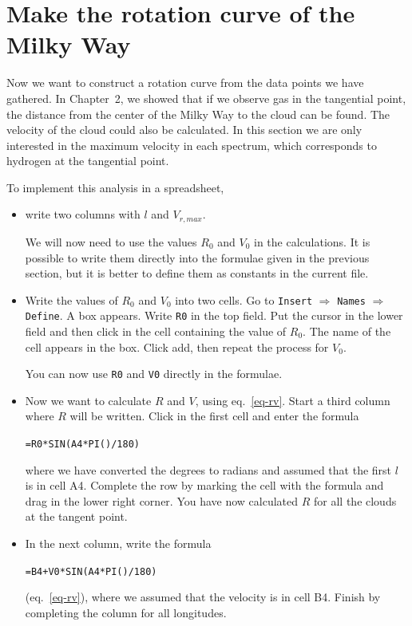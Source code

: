 \section{Make the rotation curve of the Milky Way}
Now we want to construct a rotation curve from the data points we have
gathered. In Chapter~2, we showed that if we observe gas in the tangential
point, the distance from the center of the Milky Way to the cloud can be found.
The velocity of the cloud could also be calculated. In this section we are only
interested in the maximum velocity in each spectrum, which corresponds to
hydrogen at the tangential point.

To implement this analysis in a spreadsheet, 
\begin{itemize}

\item write two columns with
$l$ and $V_{r,max}$. 
 
We will now need to use the values $R_0$ and
$V_0$ in the calculations. It is possible to write them directly into
the formulae given in the previous section, 
but it is better to define them as constants in the
current file. 

\item Write the values of $R_0$
and $V_0$ into two cells. Go to {\tt Insert} $\Rightarrow$ {\tt Names}
$\Rightarrow$ {\tt Define}. A box appears. Write {\tt R0} in the top
field. Put the cursor in the lower field and then click in the cell
containing the value of $R_0$. The name of the cell appears in the
box. Click add, then repeat the process for $V_0$.

You can now use {\tt R0} and {\tt V0} directly in the formulae. 

\item Now we want to calculate $R$ and $V$, using eq.~\ref{eq-rv}. 
Start a third column where $R$ will be written. 
Click in the first cell and enter the formula 

{\tt =R0*SIN(A4*PI()/180)}

where we have converted the degrees to radians and assumed that the
first $l$ is in cell A4. Complete the row by marking the cell with the
formula and drag in the lower right corner. You have now calculated $R$
for all the clouds at the tangent point.

\item In the next column, write the formula 

{\tt =B4+V0*SIN(A4*PI()/180)}

(eq.~\ref{eq-rv}), where we assumed that the velocity is in cell B4. Finish by completing
the column for all longitudes.  

\end{itemize}

